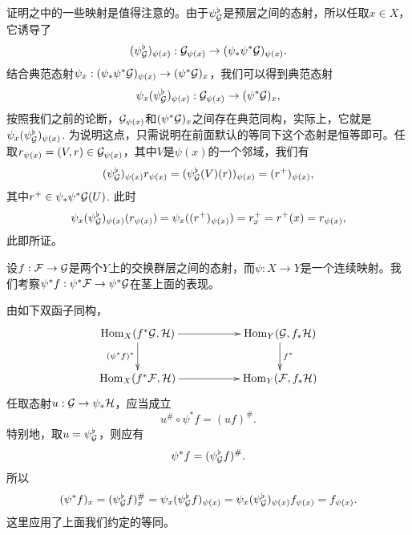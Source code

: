 证明之中的一些映射是值得注意的。由于$\psi^\flat_{\mathcal{G}}$是预层之间的态射，所以任取$x\in X$，它诱导了
\[
	(\psi^\flat_{\mathcal{G}})_{\psi(x)}:\mathcal{G}_{\psi(x)}\to (\psi_*\psi^*\mathcal{G})_{\psi(x)}.
\]
结合典范态射$\psi_x:(\psi_*\psi^*\mathcal{G})_{\psi(x)}\to (\psi^*\mathcal{G})_{x}$，我们可以得到典范态射
\[
	\psi_x(\psi^\flat_{\mathcal{G}})_{\psi(x)}:\mathcal{G}_{\psi(x)}\to (\psi^*\mathcal{G})_{x},
\]
按照我们之前的论断，$\mathcal{G}_{\psi(x)}$和$(\psi^*\mathcal{G})_{x}$之间存在典范同构，实际上，它就是$\psi_x(\psi^\flat_{\mathcal{G}})_{\psi(x)}$. 为说明这点，只需说明在前面默认的等同下这个态射是恒等即可。任取$r_{\psi(x)}=(V,r)\in \mathcal{G}_{\psi(x)}$，其中$V$是$\psi(x)$的一个邻域，我们有
\[
	(\psi^\flat_{\mathcal{G}})_{\psi(x)}r_{\psi(x)}=(\psi^\flat_{\mathcal{G}}(V)(r))_{\psi(x)}=(r^+)_{\psi(x)},
\]
其中$r^+\in \psi_*\psi^*\mathcal{G}(U)$. 此时
\[
	\psi_x(\psi^\flat_{\mathcal{G}})_{\psi(x)}(r_{\psi(x)})=\psi_x((r^+)_{\psi(x)})=r^+_x=r^+(x)=r_{\psi(x)},
\]
此即所证。

\begin{para}
设$f:\mathcal{F}\to\mathcal{G}$是两个$Y$上的交换群层之间的态射，而$\psi:X\to Y$是一个连续映射。我们考察$\psi^*f:\psi^*\mathcal{F}\to \psi^*\mathcal{G}$在茎上面的表现。

由如下双函子同构，
\[
	\xymatrix{
		\Hom_X(f^*\calg,\mathcal{H})\ar[rr] \ar[d]_{(\psi^*f)^*}&&\Hom_Y(\calg,f_*\mathcal{H}) \ar[d]^{f^*}\\
		\Hom_X(f^*\calf,\mathcal{H})\ar[rr]&&\Hom_Y(\calf,f_*\mathcal{H})
	}
\]
任取态射$u:\mathcal{G}\to \psi_*\mathcal{H}$，应当成立
\[
	u^\#\circ \psi^* f=(uf)^\#.
\]
特别地，取$u=\psi_{\mathcal{G}}^\flat$，则应有
\[
	\psi^* f=(\psi_{\mathcal{G}}^\flat f)^\#.
\]
所以
\[
	(\psi^* f)_x=(\psi_{\mathcal{G}}^\flat f)^\#_x =\psi_x (\psi_{\mathcal{G}}^\flat f)_{\psi(x)}=\psi_x (\psi_{\mathcal{G}}^\flat)_{\psi(x)} f_{\psi(x)}=f_{\psi(x)}.
\]
这里应用了上面我们约定的等同。
\end{para}

